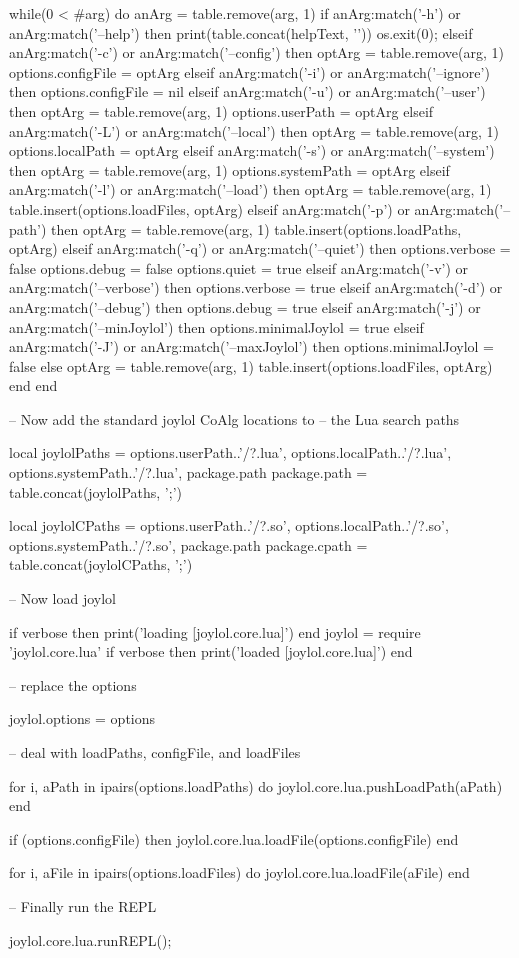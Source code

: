 while(0 < #arg) do
  anArg = table.remove(arg, 1)
  if anArg:match('-h') or anArg:match('--help') then
    print(table.concat(helpText, '\n'))
    os.exit(0);
  elseif anArg:match('-c') or anArg:match('--config') then
    optArg = table.remove(arg, 1)
    options.configFile = optArg
  elseif anArg:match('-i') or anArg:match('--ignore') then
    options.configFile = nil
  elseif anArg:match('-u') or anArg:match('--user') then
    optArg = table.remove(arg, 1)
    options.userPath = optArg
  elseif anArg:match('-L') or anArg:match('--local') then
    optArg = table.remove(arg, 1)
    options.localPath = optArg
  elseif anArg:match('-s') or anArg:match('--system') then
    optArg = table.remove(arg, 1)
    options.systemPath = optArg
  elseif anArg:match('-l') or anArg:match('--load') then
    optArg = table.remove(arg, 1)
    table.insert(options.loadFiles, optArg)
  elseif anArg:match('-p') or anArg:match('--path') then
    optArg = table.remove(arg, 1)
    table.insert(options.loadPaths, optArg)
  elseif anArg:match('-q') or anArg:match('--quiet') then
    options.verbose = false
    options.debug   = false
    options.quiet   = true
  elseif anArg:match('-v') or anArg:match('--verbose') then
    options.verbose = true
  elseif anArg:match('-d') or anArg:match('--debug') then
    options.debug = true
  elseif anArg:match('-j') or anArg:match('--minJoylol') then
    options.minimalJoylol = true
  elseif anArg:match('-J') or anArg:match('--maxJoylol') then
    options.minimalJoylol = false
  else
    optArg = table.remove(arg, 1)
    table.insert(options.loadFiles, optArg)
  end
end

-- Now add the standard joylol CoAlg locations to
-- the Lua search paths 

local joylolPaths = {
  options.userPath..'/?.lua',
  options.localPath..'/?.lua',
  options.systemPath..'/?.lua',
  package.path
}
package.path = table.concat(joylolPaths, ';')

local joylolCPaths = {
  options.userPath..'/?.so',
  options.localPath..'/?.so',
  options.systemPath..'/?.so',
  package.path
}
package.cpath = table.concat(joylolCPaths, ';')

-- Now load joylol

if verbose then print('loading [joylol.core.lua]') end
joylol = require 'joylol.core.lua'
if verbose then print('loaded [joylol.core.lua]\n') end

-- replace the options

joylol.options = options

--  deal with loadPaths, configFile, and loadFiles

for i, aPath in ipairs(options.loadPaths) do
  joylol.core.lua.pushLoadPath(aPath)
end

if (options.configFile) then
  joylol.core.lua.loadFile(options.configFile)
end

for i, aFile in ipairs(options.loadFiles) do
  joylol.core.lua.loadFile(aFile)
end

-- Finally run the REPL

joylol.core.lua.runREPL();

\stopLuaCode